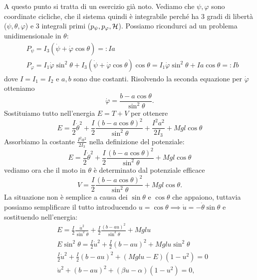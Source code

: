     A questo punto si tratta di un esercizio già noto. Vediamo che $\psi,\varphi$ sono coordinate cicliche, che il sistema quindi è integrabile perché ha 3 gradi di libertà ($\psi,\theta,\varphi$) e 3 integrali primi ($p_\psi,p_\varphi, \mathcal{H}$). Possiamo ricondurci ad un problema unidimensionale in $\theta$:
    \begin{equation}
    \begin{aligned}
        &P_\psi = I_3(\dot{\psi}+\dot{\varphi}\cos\theta)=:Ia\\
        &P_\varphi = I_1\dot{\varphi}\sin^2\theta+I_3(\dot{\psi}+\dot{\varphi}\cos\theta)\cos\theta=I_1\dot{\varphi}\sin^2\theta+Ia\cos\theta=:Ib
        \label{trottLagr}
    \end{aligned}
    \end{equation}
    dove $I=I_1=I_2$ e $a,b$ sono due costanti. Risolvendo la seconda equazione per $\dot{\varphi}$ otteniamo
    \begin{equation}
        \dot{\varphi} = \frac{b-a\cos\theta}{\sin^2\theta}.
    \end{equation}
    Sostituiamo tutto nell'energia $E=T+V$ per ottenere 
    \begin{equation}
        E = \frac{I}{2}\dot{\theta}^2+\frac{I}{2}\frac{\left(b-a\cos\theta\right)^2}{\sin^2\theta}+\frac{I^2a^2}{2I_3}+Mgl\cos\theta
    \end{equation}
    Assorbiamo la costante $\frac{I^2a^2}{2I_3}$ nella definizione del potenziale:
    \begin{equation}
         E = \frac{I}{2}\dot{\theta}^2+\frac{I}{2}\frac{\left(b-a\cos\theta\right)^2}{\sin^2\theta}+Mgl\cos\theta
    \end{equation}
    vediamo ora che il moto in $\theta$ è determinato dal potenziale efficace
    \begin{equation}
      V= \frac{I}{2}\frac{\left(b-a\cos\theta\right)^2}{\sin^2\theta}+Mgl\cos\theta.
    \end{equation}
    La situazione non è semplice a causa dei $\sin\theta$ e $\cos\theta$ che appaiono, tuttavia possiamo semplificare il tutto introducendo $u=\cos\theta\implies\dot{u} = -\dot{\theta}\sin\theta$ e sostituendo nell'energia:
    \begin{equation}
        \begin{aligned}
            &E =\frac{I}{2}\frac{\dot{u}^2}{\sin^2\theta} +\frac{I}{2}\frac{(b-au)^2}{\sin^2\theta}+Mglu\\
            &E\sin^2\theta = \frac{I}{2}\dot{u}^2 + \frac{I}{2}(b-au)^2+Mglu\sin^2\theta\\
            &\frac{I}{2}\dot{u}^2+\frac{I}{2}(b-au)^2+(Mglu-E)(1-u^2)=0\\
            & \dot{u}^2 +(b-au)^2+(\beta u-\alpha)(1-u^2)=0,
        \end{aligned}
    \end{equation}
